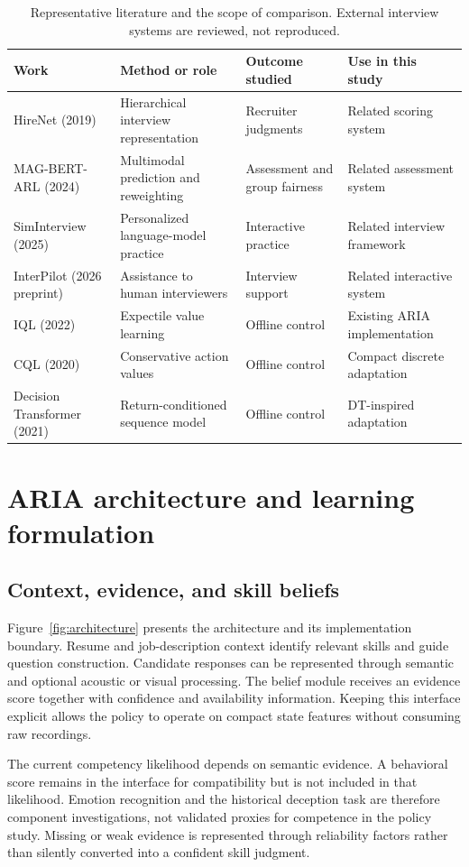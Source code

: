 \documentclass[10pt,a4paper]{article}
\begin{document}
\begin{table}[htbp]
\centering\small
\caption{Representative literature and the scope of comparison. External interview systems are reviewed, not reproduced.}
\label{tab:sota}
\begin{tabularx}{\linewidth}{p{29mm}YYY}
\toprule
Work & Method or role & Outcome studied & Use in this study \\ \midrule
HireNet (2019) & Hierarchical interview representation & Recruiter judgments & Related scoring system \\
MAG-BERT-ARL (2024) & Multimodal prediction and reweighting & Assessment and group fairness & Related assessment system \\
SimInterview (2025) & Personalized language-model practice & Interactive practice & Related interview framework \\
InterPilot (2026 preprint) & Assistance to human interviewers & Interview support & Related interactive system \\
IQL (2022) & Expectile value learning & Offline control & Existing ARIA implementation \\
CQL (2020) & Conservative action values & Offline control & Compact discrete adaptation \\
Decision Transformer (2021) & Return-conditioned sequence model & Offline control & DT-inspired adaptation \\
\bottomrule
\end{tabularx}
\end{table}

\section{ARIA architecture and learning formulation}
\subsection{Context, evidence, and skill beliefs}
Figure~\ref{fig:architecture} presents the architecture and its implementation boundary. Resume and job-description context identify relevant skills and guide question construction. Candidate responses can be represented through semantic and optional acoustic or visual processing. The belief module receives an evidence score together with confidence and availability information. Keeping this interface explicit allows the policy to operate on compact state features without consuming raw recordings.

The current competency likelihood depends on semantic evidence. A behavioral score remains in the interface for compatibility but is not included in that likelihood. Emotion recognition and the historical deception task are therefore component investigations, not validated proxies for competence in the policy study. Missing or weak evidence is represented through reliability factors rather than silently converted into a confident skill judgment.
\end{document}

